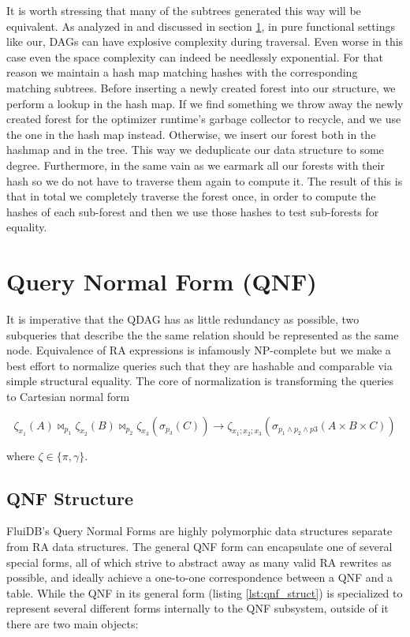 It is worth stressing that many of the subtrees generated this way
will be equivalent. As analyzed in \cite{bibtexa} and discussed in
section \ref{sec:qnf}, in pure functional settings like our, DAGs can
have explosive complexity during traversal. Even worse in this case
even the space complexity can indeed be needlessly exponential. For
that reason we maintain a hash map matching hashes with the
corresponding matching subtrees. Before inserting a newly created
forest into our structure, we perform a lookup in the hash map. If we
find something we throw away the newly created forest for the
optimizer runtime's garbage collector to recycle, and we use the one
in the hash map instead. Otherwise, we insert our forest both in the
hashmap and in the tree. This way we deduplicate our data structure to
some degree. Furthermore, in the same vain as \cite{bibtexa} we
earmark all our forests with their hash so we do not have to traverse
them again to compute it. The result of this is that in total we
completely traverse the forest once, in order to compute the hashes of
each sub-forest and then we use those hashes to test sub-forests for
equality.

\section{Query Normal Form (QNF)}
\label{sec:qnf}

It is imperative that the QDAG has as little redundancy as possible,
two subqueries that describe the the same relation should be
represented as the same node. Equivalence of RA expressions is
infamously NP-complete
\cite{sagivEquivalencesRelationalExpressions1980} but we make a best
effort to normalize queries such that they are hashable and comparable
via simple structural equality. The core of normalization is
transforming the queries to Cartesian normal form

\[
  \zeta_{x_1}(A) \Join_{p_1} \zeta_{x_2}(B) \Join_{p_2} \zeta_{x_3} (\sigma_{p_3}(C)) \to \zeta_{x_1;x_2;x_3}(\sigma_{p_1 \land p_2 \land p3}(A \times B \times C))
\]

where \(\zeta \in \{\pi,\gamma\}\).

\subsection{QNF Structure}

FluiDB's Query Normal Forms are highly polymorphic data structures
separate from RA data structures. The general QNF form can encapsulate
one of several special forms, all of which strive to abstract away as
many valid RA rewrites as possible, and ideally achieve a one-to-one
correspondence between a QNF and a table. While the QNF in its general
form (listing \ref{lst:qnf_struct}) is specialized to represent
several different forms internally to the QNF subsystem, outside of it
there are two main objects:

